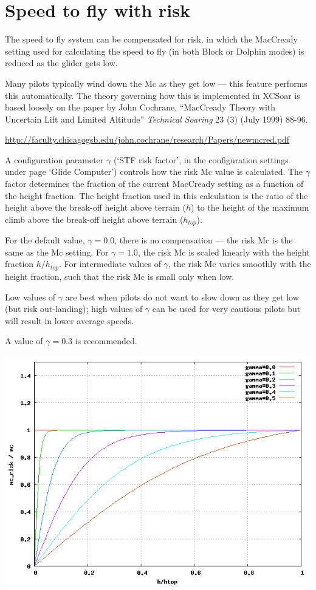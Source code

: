 \documentclass[a4paper,12pt]{refrep}
\begin{document}
\section{Speed to fly with risk}\label{sec:speed-fly-with}
  The speed to fly system can be compensated for risk, in which the
  MacCready setting used for calculating the speed to fly (in both
  Block or Dolphin modes) is reduced as the glider gets low.

  Many pilots typically wind down the Mc as they get low --- this
  feature performs this automatically.  The theory governing how this
  is implemented in XCSoar is based loosely on the paper by John
  Cochrane, ``MacCready Theory with Uncertain Lift and Limited
  Altitude'' {\em Technical Soaring} 23 (3) (July 1999) 88-96.

\url{http://faculty.chicagogsb.edu/john.cochrane/research/Papers/newmcred.pdf}

  A configuration parameter $\gamma$ (`STF risk factor', in the
  configuration settings under page `Glide Computer') controls how the
  risk Mc value is calculated.  The $\gamma$ factor determines the
  fraction of the current MacCready setting as a function of the
  height fraction.  The height fraction used in this calculation is
  the ratio of the height above the break-off height above terrain
  ($h$) to the height of the maximum climb above the break-off height
  above terrain ($h_{top}$).

  For the default value, $\gamma=0.0$, there is no compensation ---
  the risk Mc is the same as the Mc setting.  For $\gamma=1.0$, the
  risk Mc is scaled linearly with the height fraction $h/h_{top}$.
  For intermediate values of $\gamma$, the risk Mc varies smoothly
  with the height fraction, such that the risk Mc is small only when
  low.

  Low values of $\gamma$ are best when pilots do not want to slow down
  as they get low (but risk out-landing); high values of $\gamma$ can
  be used for very cautious pilots but will result in lower average
  speeds.

  A value of $\gamma=0.3$ is recommended.

\begin{center}
\includegraphics[angle=0,width=\linewidth,keepaspectratio='true']{figures/riskmc.png}
\end{center}
\end{document}
